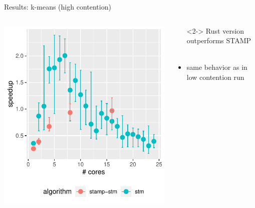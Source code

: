 \documentclass[aspectratio=169, usenames, dvipsnames]{beamer}
\newcommand{\cmark}{\ding{51}}%
\newcommand{\done}{\rlap{$\square$}{\raisebox{2pt}{\large\hspace{1pt}\cmark}}%
\hspace{-2.5pt}}
\begin{document}
\begin{frame}{Results: k-means (high contention)}
    \begin{columns}%
        \begin{column}{0.5\textwidth}
            \centering
            \includegraphics[width=\textwidth,height=.65\textheight,keepaspectratio]{img/combined_plots/kmeans-high++}
        \end{column}%
        \begin{column}{0.5\textwidth}
            \begin{itemize}
                \item[\done]<2-> Rust version outperforms STAMP\\ \ 
            \end{itemize}
            
            \begin{itemize}
                \item<3-> same behavior as in low contention run
            \end{itemize}
        \end{column}
    \end{columns}
\end{frame}
\end{document}
